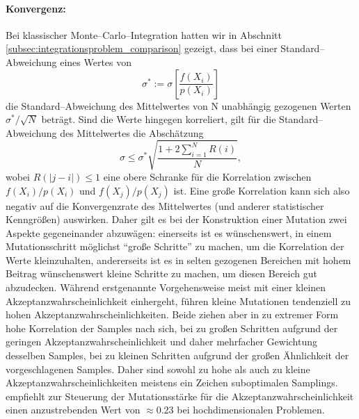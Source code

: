	\paragraph{Konvergenz:}Bei klassischer Monte--Carlo--Integration hatten wir in Abschnitt \ref{subsec:integrationsproblem_comparison} gezeigt, dass bei einer Standard--Abweichung eines Wertes von $$\sigma^*:=\sigma\left[\frac{f(X_i)}{p(X_i)}\right]$$ die Standard--Abweichung des Mittelwertes von N unabhängig gezogenen Werten $\sigma^*/\sqrt{N}$ beträgt. Sind die Werte hingegen korreliert, gilt für die Standard--Abweichung des Mittelwertes die Abschätzung \citep[siehe][VII.\;\S3(8)]{Renyi:1964p10655}
	$$\sigma\leq \sigma^*\sqrt{\frac{1+2\sum_{i=1}^N R(i)}{N}},$$
	wobei $R(|j-i|)\leq 1$ eine obere Schranke für die Korrelation zwischen $f(X_i)/p(X_i)$ und $f(X_j)/p(X_j)$ ist.
	Eine große Korrelation kann sich also negativ auf die Konvergenzrate des Mittelwertes (und anderer statistischer Kenngrößen) auswirken. Daher gilt es bei der Konstruktion einer Mutation zwei Aspekte gegeneinander abzuwägen: einerseits ist es wünschenswert, in einem Mutationsschritt möglichst ``große Schritte'' zu machen, um die Korrelation der Werte kleinzuhalten, andererseits ist es in selten gezogenen Bereichen mit hohem Beitrag wünschenswert kleine Schritte zu machen, um diesen Bereich gut abzudecken. Während erstgenannte Vorgehensweise meist mit einer kleinen Akzeptanzwahrscheinlichkeit einhergeht, führen kleine Mutationen tendenziell zu hohen Akzeptanzwahrscheinlichkeiten. Beide ziehen aber in zu extremer Form hohe Korrelation der Samples nach sich, bei zu großen Schritten aufgrund der geringen Akzeptanzwahrscheinlichkeit und daher mehrfacher Gewichtung desselben Samples, bei zu kleinen Schritten aufgrund der großen Ähnlichkeit der vorgeschlagenen Samples. Daher sind sowohl zu hohe als auch zu kleine Akzeptanzwahrscheinlichkeiten meistens ein Zeichen suboptimalen Samplings. \citet{Roberts:1997p5198} empfiehlt zur Steuerung der Mutationsstärke für die Akzeptanzwahrscheinlichkeit einen anzustrebenden Wert von $\approx 0.23$ bei hochdimensionalen Problemen.

	
	
